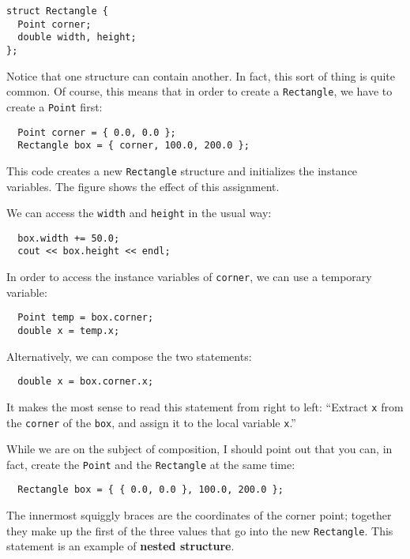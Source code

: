 \begin{verbatim}
struct Rectangle {
  Point corner;
  double width, height;
};  
\end{verbatim}
%
Notice that one structure can contain another.  In fact, this
sort of thing is quite common.  Of course, this means that in
order to create a {\tt Rectangle}, we have to create a {\tt Point}
first:

\begin{verbatim}
  Point corner = { 0.0, 0.0 };
  Rectangle box = { corner, 100.0, 200.0 };
\end{verbatim}
%
This code creates a new {\tt Rectangle} structure and initializes the
instance variables.  The figure shows the effect of this assignment.

\vspace{0.1in}
\centerline{}
\vspace{0.1in}
%
We can access the {\tt width} and {\tt height} in the usual way:

\begin{verbatim}
  box.width += 50.0;
  cout << box.height << endl;
\end{verbatim}
%
In order to access the instance variables of {\tt corner}, we can use a
temporary variable:

\begin{verbatim}
  Point temp = box.corner;
  double x = temp.x;
\end{verbatim}
%
Alternatively, we can compose the two statements:


\begin{verbatim}
  double x = box.corner.x;
\end{verbatim}
%
It makes the most sense to read this statement from right to
left: ``Extract {\tt x} from the {\tt corner} of the {\tt box},
and assign it to the local variable {\tt x}.''

While we are on the subject of composition, I should point
out that you can, in fact, create the {\tt Point} and the
{\tt Rectangle} at the same time:

\begin{verbatim}
  Rectangle box = { { 0.0, 0.0 }, 100.0, 200.0 };
\end{verbatim}
%
The innermost squiggly braces are the coordinates of the
corner point; together they make up the first of the three
values that go into the new {\tt Rectangle}.  This statement
is an example of {\bf nested structure}.


